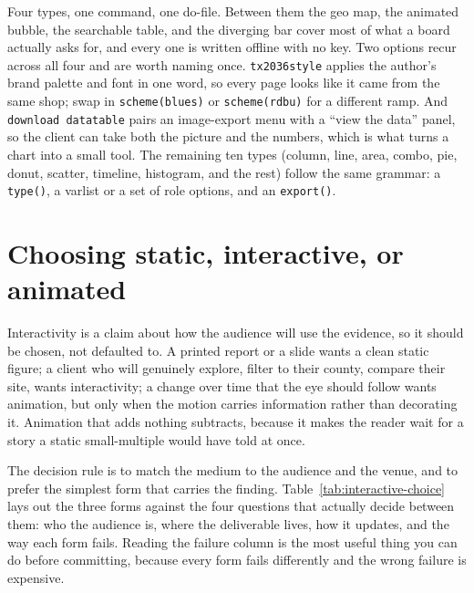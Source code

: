 \documentclass[
    a4paper,
    fontsize=10pt,
    twoside=true,
    numbers=noenddot,
]{kaobook}
\begin{document}
Four types, one command, one do-file. Between them the geo map, the animated bubble, the searchable table, and the diverging bar cover most of what a board actually asks for, and every one is written offline with no key. Two options recur across all four and are worth naming once. \texttt{tx2036style} applies the author's brand palette and font in one word, so every page looks like it came from the same shop; swap in \texttt{scheme(blues)} or \texttt{scheme(rdbu)} for a different ramp. And \texttt{download datatable} pairs an image-export menu with a \enquote{view the data} panel, so the client can take both the picture and the numbers, which is what turns a chart into a small tool. The remaining ten types (column, line, area, combo, pie, donut, scatter, timeline, histogram, and the rest) follow the same grammar: a \texttt{type()}, a varlist or a set of role options, and an \texttt{export()}.

\section{Choosing static, interactive, or animated}
Interactivity is a claim about how the audience will use the evidence, so it should be chosen, not defaulted to. A printed report or a slide wants a clean static figure; a client who will genuinely explore, filter to their county, compare their site, wants interactivity; a change over time that the eye should follow wants animation, but only when the motion carries information rather than decorating it. Animation that adds nothing subtracts, because it makes the reader wait for a story a static small-multiple would have told at once.

The decision rule is to match the medium to the audience and the venue, and to prefer the simplest form that carries the finding. Table~\ref{tab:interactive-choice} lays out the three forms against the four questions that actually decide between them: who the audience is, where the deliverable lives, how it updates, and the way each form fails. Reading the failure column is the most useful thing you can do before committing, because every form fails differently and the wrong failure is expensive.
\end{document}
